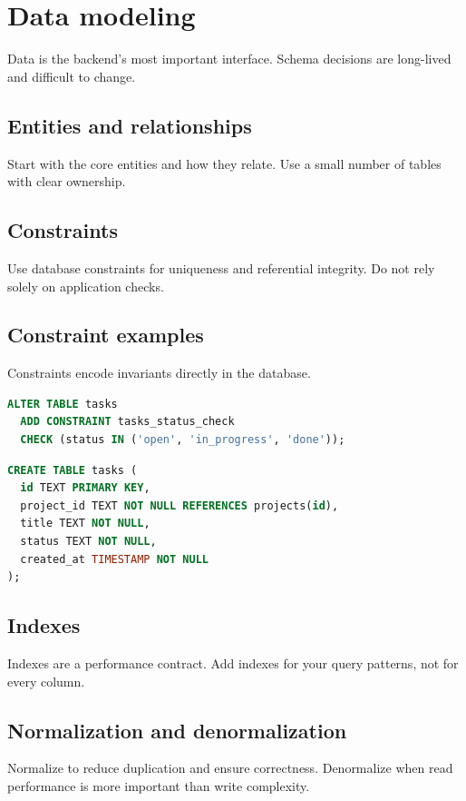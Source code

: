 \chapter{Data modeling}

Data is the backend's most important interface.
Schema decisions are long-lived and difficult to change.

\section{Entities and relationships}
Start with the core entities and how they relate.
Use a small number of tables with clear ownership.

\section{Constraints}
Use database constraints for uniqueness and referential integrity.
Do not rely solely on application checks.

\section{Constraint examples}
Constraints encode invariants directly in the database.
\begin{lstlisting}[language=SQL]
ALTER TABLE tasks
  ADD CONSTRAINT tasks_status_check
  CHECK (status IN ('open', 'in_progress', 'done'));
\end{lstlisting}

\begin{lstlisting}[language=SQL]
CREATE TABLE tasks (
  id TEXT PRIMARY KEY,
  project_id TEXT NOT NULL REFERENCES projects(id),
  title TEXT NOT NULL,
  status TEXT NOT NULL,
  created_at TIMESTAMP NOT NULL
);
\end{lstlisting}

\section{Indexes}
Indexes are a performance contract.
Add indexes for your query patterns, not for every column.

\section{Normalization and denormalization}
Normalize to reduce duplication and ensure correctness.
Denormalize when read performance is more important than write complexity.

